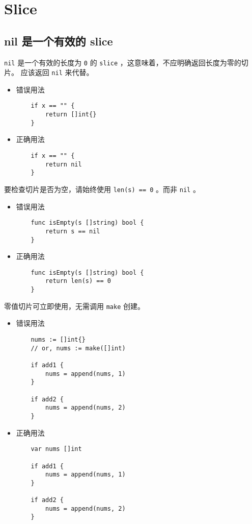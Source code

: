 \chapter{Slice}
\section{nil 是一个有效的 slice}
\texttt{nil} 是一个有效的长度为 \texttt{0} 的 \texttt{slice} ，这意味着，不应明确返回长度为零的切片。
应该返回 \texttt{nil} 来代替。
\begin{itemize}[leftmargin=4em]
\item 错误用法

  \begin{verbatim}
    if x == "" {
    	return []int{}
    }
  \end{verbatim}
\item 正确用法

  \begin{verbatim}
    if x == "" {
    	return nil
    }
  \end{verbatim}
\end{itemize}

要检查切片是否为空，请始终使用 \texttt{len(s) == 0} 。而非 \texttt{nil} 。
\begin{itemize}[leftmargin=4em]
\item 错误用法

  \begin{verbatim}
    func isEmpty(s []string) bool {
    	return s == nil
    }
  \end{verbatim}
\item 正确用法

  \begin{verbatim}
    func isEmpty(s []string) bool {
    	return len(s) == 0
    }
  \end{verbatim}
\end{itemize}

零值切片可立即使用，无需调用 \texttt{make} 创建。
\begin{itemize}[leftmargin=4em]
\item 错误用法

  \begin{verbatim}
    nums := []int{}
    // or, nums := make([]int)

    if add1 {
    	nums = append(nums, 1)
    }

    if add2 {
    	nums = append(nums, 2)
    }
  \end{verbatim}
\item 正确用法

  \begin{verbatim}
    var nums []int

    if add1 {
    	nums = append(nums, 1)
    }

    if add2 {
    	nums = append(nums, 2)
    }
  \end{verbatim}
\end{itemize}

